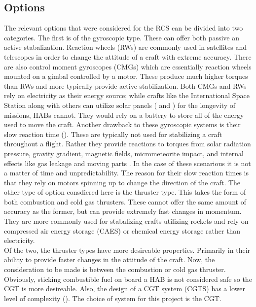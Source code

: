 \subsection{Options}
The relevant options that were considered for the RCS can be divided into two categories. The first is of the gyroscopic type. These can offer both passive an active stabalization. Reaction wheels (RWs) are commonly used in satellites and telescopes in order to change the attitude of a craft with extreme accuracy. There are also control moment gyroscopes (CMGs) which are essentially reaction wheels mounted on a gimbal controlled by a motor. These produce much higher torques than RWs and more typically provide active stabilization. Both CMGs and RWs rely on electricity as their energy source; while crafts like the International Space Station along with others can utilize solar panels (\cite{satellitebattery} and \cite{satellitebattery2}) for the longevity of missions, HABs cannot. They would rely on a battery to store all of the energy used to move the craft. Another drawback to these gyroscopic systems is their slow reaction time (\cite{satellitecontrol}). These are typically not used for stabilizing a craft throughout a flight. Rather they provide reactions to torques from solar radiation pressure, gravity gradient, magnetic fields, micrometeorite impact, and internal effects like gas leakage and moving parts \cite{electricvthruster}. In the case of these scenarious it is not a matter of time and unpredictability. The reason for their slow reaction times is that they rely on motors spinning up to change the direction of the craft. The other type of option consdiered here is the thruster type. This takes the form of both combustion and cold gas thrusters. These cannot offer the same amount of accuracy as the former, but can provide extremely fast changes in momentum. They are more commonly used for stabalizing crafts utilizing rockets and rely on compressed air energy storage (CAES) or chemical energy storage rather than electricity.\\
Of the two, the thruster types have more desireable properties. Primarily in their ability to provide faster changes in the attitude of the craft. Now, the consideration to be made is between the combustion or cold gas thruster. Obviously, sticking combustible fuel on board a HAB is not considered safe so the CGT is more desireable. Also, the design of a CGT system (CGTS) has a lower level of complexity (\cite{microthruster}). The choice of system for this project is the CGT.
